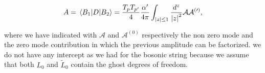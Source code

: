 \begin{equation}
A = \mel{B_1}{D}{B_2} = \frac{T_p T_{p'}}{4}\frac{\alpha'}{4\pi}\int_{\abs{z}\leq 1}{\frac{d^z}{\abs{z}^2}\mathcal{A}\mathcal{A^{(0)}}},
\end{equation}

where we have indicated with $\mathcal{A}$ and $\mathcal{A^{(0)}}$ respectively
the non zero mode and the zero mode contribution in which the previous
amplitude can be factorized. we do not have any intercept as we had for the
bosonic string because we assume that both $L_0$ and $\tilde{L}_0$ contain the
ghost degrees of freedom.
